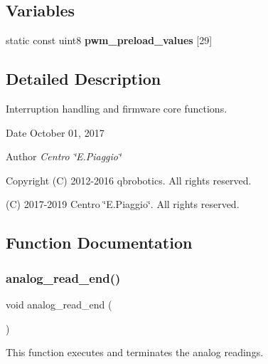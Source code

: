 \subsection*{Variables}
\begin{DoxyCompactItemize}
\item 
static const uint8 {\bfseries pwm\+\_\+preload\+\_\+values} [29]
\end{DoxyCompactItemize}


\subsection{Detailed Description}
Interruption handling and firmware core functions. 

\begin{DoxyDate}{Date}
October 01, 2017 
\end{DoxyDate}
\begin{DoxyAuthor}{Author}
{\itshape Centro \char`\"{}\+E.\+Piaggio\char`\"{}} 
\end{DoxyAuthor}
\begin{DoxyCopyright}{Copyright}
(C) 2012-\/2016 qbrobotics. All rights reserved. 

(C) 2017-\/2019 Centro \char`\"{}\+E.\+Piaggio\char`\"{}. All rights reserved. 
\end{DoxyCopyright}


\subsection{Function Documentation}
\mbox{\label{interruptions_8c_a00a8d34962a63161405e5d7785b9625e}} 
\subsubsection{analog\+\_\+read\+\_\+end()}
{\footnotesize\ttfamily void analog\+\_\+read\+\_\+end (\begin{DoxyParamCaption}{ }\end{DoxyParamCaption})}

This function executes and terminates the analog readings. \mbox{\label{interruptions_8c_a77877c16b42f6f384f7c80d3002aed22}} 
